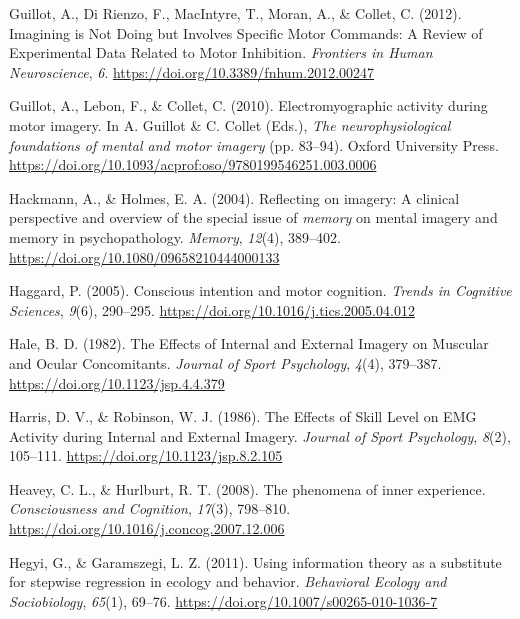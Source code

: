 \documentclass[a4paper,12pt,twoside,openright,oldfontcommands]{memoir}
\begin{document}
\leavevmode\hypertarget{ref-guillot_imagining_2012}{}%
Guillot, A., Di Rienzo, F., MacIntyre, T., Moran, A., \& Collet, C. (2012). Imagining is Not Doing but Involves Specific Motor Commands: A Review of Experimental Data Related to Motor Inhibition. \emph{Frontiers in Human Neuroscience}, \emph{6}. \url{https://doi.org/10.3389/fnhum.2012.00247}

\leavevmode\hypertarget{ref-guillot_electromyographic_2010}{}%
Guillot, A., Lebon, F., \& Collet, C. (2010). Electromyographic activity during motor imagery. In A. Guillot \& C. Collet (Eds.), \emph{The neurophysiological foundations of mental and motor imagery} (pp. 83--94). Oxford University Press. \url{https://doi.org/10.1093/acprof:oso/9780199546251.003.0006}

\leavevmode\hypertarget{ref-hackmann_reflecting_2004}{}%
Hackmann, A., \& Holmes, E. A. (2004). Reflecting on imagery: A clinical perspective and overview of the special issue of \emph{memory} on mental imagery and memory in psychopathology. \emph{Memory}, \emph{12}(4), 389--402. \url{https://doi.org/10.1080/09658210444000133}

\leavevmode\hypertarget{ref-haggard_conscious_2005}{}%
Haggard, P. (2005). Conscious intention and motor cognition. \emph{Trends in Cognitive Sciences}, \emph{9}(6), 290--295. \url{https://doi.org/10.1016/j.tics.2005.04.012}

\leavevmode\hypertarget{ref-hale_effects_1982}{}%
Hale, B. D. (1982). The Effects of Internal and External Imagery on Muscular and Ocular Concomitants. \emph{Journal of Sport Psychology}, \emph{4}(4), 379--387. \url{https://doi.org/10.1123/jsp.4.4.379}

\leavevmode\hypertarget{ref-harris_effects_1986}{}%
Harris, D. V., \& Robinson, W. J. (1986). The Effects of Skill Level on EMG Activity during Internal and External Imagery. \emph{Journal of Sport Psychology}, \emph{8}(2), 105--111. \url{https://doi.org/10.1123/jsp.8.2.105}

\leavevmode\hypertarget{ref-heavey_phenomena_2008}{}%
Heavey, C. L., \& Hurlburt, R. T. (2008). The phenomena of inner experience. \emph{Consciousness and Cognition}, \emph{17}(3), 798--810. \url{https://doi.org/10.1016/j.concog.2007.12.006}

\leavevmode\hypertarget{ref-hegyi_using_2011}{}%
Hegyi, G., \& Garamszegi, L. Z. (2011). Using information theory as a substitute for stepwise regression in ecology and behavior. \emph{Behavioral Ecology and Sociobiology}, \emph{65}(1), 69--76. \url{https://doi.org/10.1007/s00265-010-1036-7}
\end{document}
